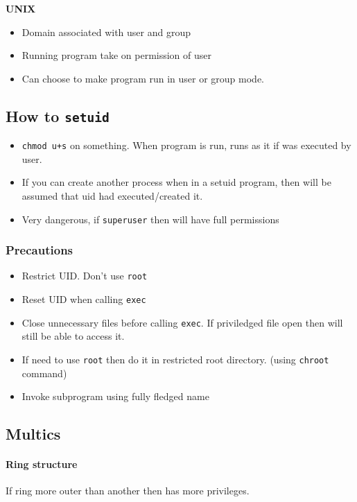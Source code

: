 \documentclass{article}
\begin{document}
		\textbf{UNIX}
		\begin{itemize}
			\item Domain associated with user and group
			\item Running program take on permission of user
			\item Can choose to make program run in user or group mode.
		\end{itemize}
		
	\subsection{How to \texttt{setuid}}
		\begin{itemize}
			\item 	\texttt{chmod u+s} on something. When program is run, runs as it if was executed by user.
			\item 	If you can create another process when in a setuid program, then will be assumed that uid had executed/created it.
			\item 	Very dangerous, if \texttt{superuser} then will have full permissions
		\end{itemize}
		
		\subsubsection{Precautions}
			\begin{itemize}
				\item Restrict UID. Don't use \texttt{root}
				\item Reset UID when calling \texttt{exec}
				\item Close unnecessary files before calling \texttt{exec}. If priviledged file open then will still be able to access it.
				\item If need to use \texttt{root} then do it in restricted root directory. (using \texttt{chroot} command)
				\item Invoke subprogram using fully fledged name
			\end{itemize}
			
	\subsection{Multics}
		\paragraph{Ring structure} If ring more outer than another then has more privileges.\\
		
\end{document}
